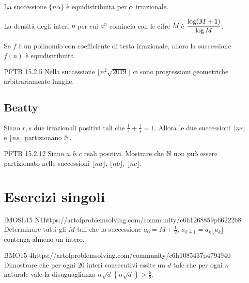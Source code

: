 \documentclass[12pt]{article}
\begin{document}
\begin{corollary}
    La successione $\{ n\alpha \}$ è equidistribuita per $\alpha$ irrazionale.
\end{corollary}

\begin{corollary}
    La densità degli interi $n$ per cui $a^n$ comincia con le cifre $M$ è $\displaystyle\frac{\log(M+1)}{\log M}$.
\end{corollary}

\begin{theorem}
    Se $f$ è un polinomio con coefficiente di testa irrazionale, allora la successione $f(n)$ è equidistribuita.
\end{theorem}

\begin{esercizio}{PFTB 15.2.5}{}
    Nella successione $\lfloor n^2\sqrt{2019} \rfloor$ ci sono progressioni geometriche arbitrariamente lunghe.
\end{esercizio}

\subsection{Beatty}
\begin{theorem}
    Siano $r,s$ due irrazionali positivi tali che $\frac1r+\frac1s=1$. Allora le due successioni $\lfloor nr\rfloor$ e $\lfloor ns \rfloor$ partizionano $\mathbb{N}$.
\end{theorem}

\begin{esercizio}{PFTB 15.2.12}{}
    Siano $a,b,c$ reali positivi. Mostrare che $\mathbb{N}$ non può essere partizionato nelle successioni $\lfloor na\rfloor$, $\lfloor nb\rfloor$, $\lfloor nc\rfloor$.
\end{esercizio}







\section{Esercizi singoli}

\begin{esercizio}{IMOSL15 N1}{https://artofproblemsolving.com/community/c6h1268859p6622268}
    Determinare tutti gli $M$ tali che la successione $a_0=M+\frac1 2$, $a_{k+1}=a_k\lfloor a_k\rfloor$ contenga almeno un intero.
\end{esercizio}

\begin{esercizio}{BMO15 4}{https://artofproblemsolving.com/community/c6h1085437p4794940}
    Dimostrare che per ogni $20$ interi consecutivi essite un $d$ tale che per ogni $n$ naturale vale la disuguaglianza $n\sqrt d\left\{ n\sqrt d \right\}>\frac 5 2$.
\end{esercizio}
\end{document}
